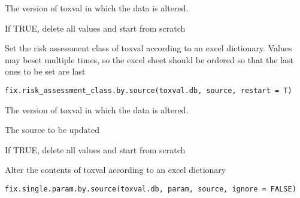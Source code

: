 \documentclass[letterpaper]{book}
\begin{document}
%
\begin{Arguments}
\begin{ldescription}
\item[\code{toxval.db}] The version of toxval in which the data is altered.

\item[\code{restart}] If TRUE, delete all values and start from scratch
\end{ldescription}
\end{Arguments}
%
\begin{Description}\relax
Set the risk assessment class of toxval according to an excel dictionary.
Values may beset multiple times, so the excel sheet should be ordered so that
the last ones to be set are last
\end{Description}
%
\begin{Usage}
\begin{verbatim}
fix.risk_assessment_class.by.source(toxval.db, source, restart = T)
\end{verbatim}
\end{Usage}
%
\begin{Arguments}
\begin{ldescription}
\item[\code{toxval.db}] The version of toxval in which the data is altered.

\item[\code{source}] The source to be updated

\item[\code{restart}] If TRUE, delete all values and start from scratch
\end{ldescription}
\end{Arguments}
%
\begin{Description}\relax
Alter the contents of toxval according to an excel dictionary
\end{Description}
%
\begin{Usage}
\begin{verbatim}
fix.single.param.by.source(toxval.db, param, source, ignore = FALSE)
\end{verbatim}
\end{Usage}
\end{document}
